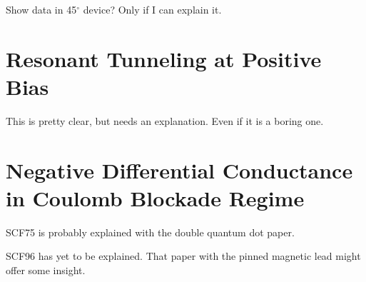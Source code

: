 Show data in 45$^\circ$ device? Only if I can explain it.

\section{Resonant Tunneling at Positive Bias}

This is pretty clear, but needs an explanation. Even if it is a boring one.

\section{Negative Differential Conductance in Coulomb Blockade Regime}

SCF75 is probably explained with the double quantum dot paper.

SCF96 has yet to be explained. That paper with the pinned magnetic lead might offer some insight.